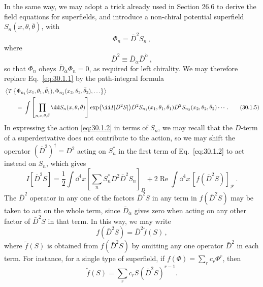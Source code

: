 In the same way, we may adopt a trick already used in Section 26.6 to derive
the field equations for superfields, and introduce a non-chiral potential
superfield \(S_n(x,\theta,\bar\theta)\), with
\begin{equation}
  \Phi_n=\bar D^2S_n\,,
  \tag{30.1.3}\label{eq:30.1.3}
\end{equation}
where
\begin{equation}
  \bar D^2
  \equiv\bar D_{\dot\alpha}\bar D^{\dot\alpha}\,,
  \tag{30.1.4}\label{eq:30.1.4}
\end{equation}
so that \(\Phi_n\) obeys \(\bar D_{\dot\alpha}\Phi_n=0\), as required
for left chirality. We may therefore replace Eq.~\eqref{eq:30.1.1} by
the path-integral formula
\begin{align}
  &\left\langle
    T\left\{\Phi_{n_1}(x_1,\theta_1,\bar\theta_1),
      \Phi_{n_2}(x_2,\theta_2,\bar\theta_2),\ldots\right\}
   \right\rangle \notag\\
  &\qquad={}
  \int\left[\prod_{n,x,\theta,\bar\theta}
      \dd S_n(x,\theta,\bar\theta)\right]
    \exp\bigl(\ii I[\bar D^2S]\bigr)
    \bar D^2S_{n_1}(x_1,\theta_1,\bar\theta_1)
    \bar D^2S_{n_2}(x_2,\theta_2,\bar\theta_2)\cdots\,.
  \tag{30.1.5}\label{eq:30.1.5}
\end{align}
In expressing the action \eqref{eq:30.1.2} in terms of \(S_n\), we may recall
that the \(D\)-term of a superderivative does not contribute to the action, so
we may shift the operator
\((\bar D^2)^\dagger=D^2\) acting on \(S_n^*\) in the first term of
Eq.~\eqref{eq:30.1.2} to act instead on \(S_n\), which gives
\begin{equation}
  I[\bar D^2S]
  =\frac12\int \dd^4x
    \left[\sum_n S_n^*D^2\bar D^2S_n\right]_D
   +2\operatorname{Re}\int \dd^4x\,
    [f(\bar D^2S)]_{\mathcal{F}}\,.
  \tag{30.1.6}\label{eq:30.1.6}
\end{equation}
The \(\bar D^2\) operator in any one of the factors \(\bar D^2S\) in
any term in \(f(\bar D^2S)\) may be taken to act on the whole term, since
\(\bar D_{\dot\alpha}\) gives zero when acting on any other factor of
\(\bar D^2S\) in that term. In this way, we may write
\begin{equation}
  f(\bar D^2S)=\bar D^2\widetilde f(S)\,,
  \tag{30.1.7}\label{eq:30.1.7}
\end{equation}
where \(\widetilde f(S)\) is obtained from \(f(\bar D^2S)\) by omitting
any one operator \(\bar D^2\) in each term. For instance, for a single
type of superfield, if \(f(\Phi)=\sum_r c_r\Phi^r\), then
\[
  \widetilde f(S)=\sum_r c_rS(\bar D^2S)^{r-1}.
\]

